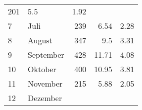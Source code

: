 \begin{longtable}{lXrrr}
       \num{201} &
       \num[round-mode=places,round-precision=2]{5,5} &
         \num[round-mode=places,round-precision=2]{1,92} \\

     7 &
     \multicolumn{1}{X}{ Juli   } &


       \num{239} &
       \num[round-mode=places,round-precision=2]{6,54} &
         \num[round-mode=places,round-precision=2]{2,28} \\

     8 &
     \multicolumn{1}{X}{ August   } &


       \num{347} &
       \num[round-mode=places,round-precision=2]{9,5} &
         \num[round-mode=places,round-precision=2]{3,31} \\

     9 &
     \multicolumn{1}{X}{ September   } &


       \num{428} &
       \num[round-mode=places,round-precision=2]{11,71} &
         \num[round-mode=places,round-precision=2]{4,08} \\

     10 &
     \multicolumn{1}{X}{ Oktober   } &


       \num{400} &
       \num[round-mode=places,round-precision=2]{10,95} &
         \num[round-mode=places,round-precision=2]{3,81} \\

     11 &
     \multicolumn{1}{X}{ November   } &


       \num{215} &
       \num[round-mode=places,round-precision=2]{5,88} &
         \num[round-mode=places,round-precision=2]{2,05} \\

     12 &
     \multicolumn{1}{X}{ Dezember   } &



\end{longtable}
